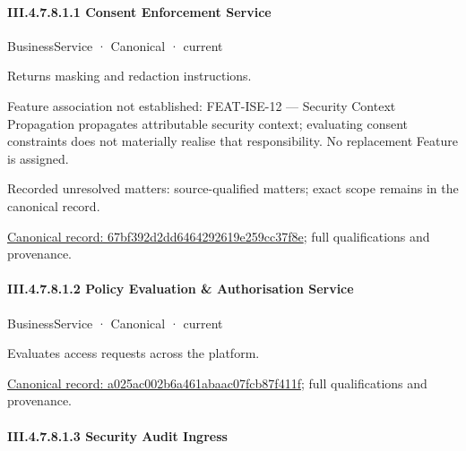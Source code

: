 \paragraph*{III.4.7.8.1.1 Consent Enforcement Service}
\label{navigation:III.4.7.8.1.1}

\label{element:67bf392d2dd6464292619e259cc37f8e}
{\small BusinessService · Canonical · current}\par

Returns masking and redaction instructions.



Feature association not established: FEAT-ISE-12 — Security Context Propagation propagates attributable security context; evaluating consent constraints does not materially realise that responsibility. No replacement Feature is assigned.


{\small Recorded unresolved matters: source-qualified matters; exact scope remains in the canonical record.}\par
{\footnotesize \href{../../../../../../../continuum/business/business-service/67bf392d2dd6464292619e259cc37f8e.md}{Canonical record: 67bf392d2dd6464292619e259cc37f8e}; full qualifications and provenance.}\par
\paragraph*{III.4.7.8.1.2 Policy Evaluation \& Authorisation Service}
\label{navigation:III.4.7.8.1.2}

\label{element:a025ac002b6a461abaac07fcb87f411f}
{\small BusinessService · Canonical · current}\par

Evaluates access requests across the platform.


{\footnotesize \href{../../../../../../../continuum/business/business-service/a025ac002b6a461abaac07fcb87f411f.md}{Canonical record: a025ac002b6a461abaac07fcb87f411f}; full qualifications and provenance.}\par
\paragraph*{III.4.7.8.1.3 Security Audit Ingress}
\label{navigation:III.4.7.8.1.3}

